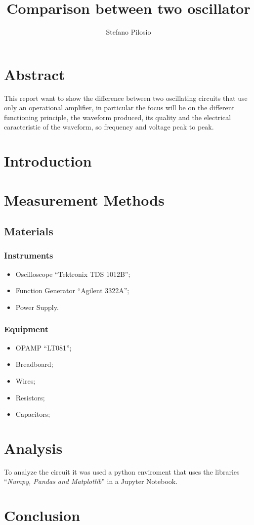 \documentclass[a4paper]{article}
\begin{document}
\title{Comparison between two oscillator}
\author{Stefano Pilosio}

\maketitle

\section{Abstract}

This report want to show the difference between two oscillating circuits that use only an operational amplifier, in particular the focus will be on the different functioning principle, the waveform produced, its quality and the electrical caracteristic of the waveform, so frequency and voltage peak to peak.

\section{Introduction}

\section{Measurement Methods}
\subsection{Materials}
\subsubsection{Instruments}
\begin{itemize}
    \item Oscilloscope ``Tektronix TDS 1012B'';
    \item Function Generator ``Agilent 3322A'';
    \item Power Supply.
\end{itemize}
\subsubsection{Equipment}
\begin{itemize}
    \item OPAMP ``LT081'';
    \item Breadboard;
    \item Wires;
    \item Resistors;
    \item Capacitors;
\end{itemize}

\section{Analysis}
To analyze the circuit it was used a python enviroment that uses the libraries ``\emph{Numpy, Pandas and Matplotlib}'' in a Jupyter Notebook. 

\section{Conclusion}
\end{document}
